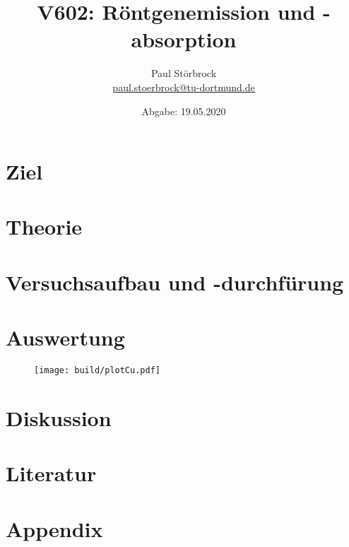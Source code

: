 
\usepackage{tikz}

\newcommand*\circled[1]{\tikz[baseline=(char.base)]{
            \node[shape=circle,draw,inner sep=2pt] (char) {#1};}}


    \title{V602: Röntgenemission und -absorption}
    \author{  
    Paul Störbrock\\
    \texorpdfstring{\href{mailto:paul.stoerbrock@tu-dortmund.de}{paul.stoerbrock@tu-dortmund.de}}{}
    }
    \date{Abgabe: 19.05.2020\vspace{-4ex}}
\maketitle
    
\newpage
\tableofcontents
\newpage

\setcounter{page}{1}

\section{Ziel}

\section{Theorie}

\section{Versuchsaufbau und -durchfürung}

\section{Auswertung}

    \begin{figure}[H]
        \centering
        \texttt{[image: build/plotCu.pdf]}
        \label{fig:}
    \end{figure}

\section{Diskussion}

\newpage
\section{Literatur}

\newpage
\section{Appendix}

